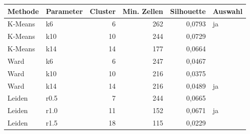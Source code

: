 \begin{tabular}{llrrrl}
\toprule
Methode & Parameter & Cluster & Min. Zellen & Silhouette & Auswahl \\
\midrule
K-Means & k6 & 6 & 262 & 0,0793 & ja \\
K-Means & k10 & 10 & 244 & 0,0729 &  \\
K-Means & k14 & 14 & 177 & 0,0664 &  \\
Ward & k6 & 6 & 247 & 0,0467 &  \\
Ward & k10 & 10 & 216 & 0,0375 &  \\
Ward & k14 & 14 & 216 & 0,0489 & ja \\
Leiden & r0.5 & 7 & 244 & 0,0665 &  \\
Leiden & r1.0 & 11 & 152 & 0,0671 & ja \\
Leiden & r1.5 & 18 & 115 & 0,0229 &  \\
\bottomrule
\end{tabular}
